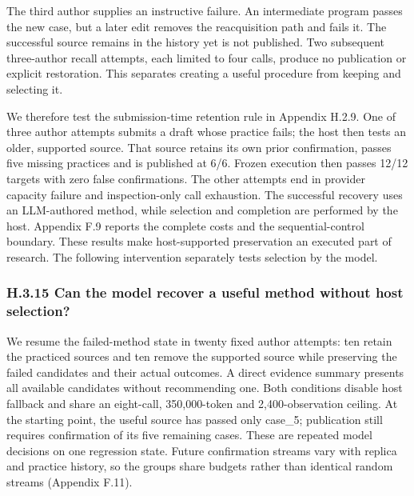 \documentclass[twoside,11pt]{article}
\begin{document}
The third author supplies an instructive failure. An intermediate program passes
the new case, but a later edit removes the reacquisition path and fails it. The
successful source remains in the history yet is not published. Two subsequent
three-author recall attempts, each limited to four calls, produce no publication
or explicit restoration. This separates creating a useful procedure from keeping
and selecting it.


We therefore test the submission-time retention rule in Appendix H.2.9. One of
three author attempts submits a draft whose practice fails; the host then tests
an older, supported source. That source retains its own prior confirmation,
passes five missing practices and is published at 6/6. Frozen execution then
passes 12/12 targets with zero false confirmations. The other attempts end in
provider capacity failure and inspection-only call exhaustion. The successful
recovery uses an LLM-authored method, while selection and completion are performed
by the host. Appendix F.9 reports the complete costs and the sequential-control
boundary. These results make host-supported preservation an executed part of research.
The following intervention separately tests selection by the model.


\subsubsection*{H.3.15 Can the model recover a useful method without host selection?}

We resume the failed-method state in twenty fixed author attempts: ten retain
the practiced sources and ten remove the supported source while preserving the
failed candidates and their actual outcomes. A direct evidence summary presents
all available candidates without recommending one. Both conditions disable host
fallback and share an eight-call, 350,000-token and 2,400-observation ceiling.
At the starting point, the useful source has passed only case\_5; publication
still requires confirmation of its five remaining cases. These are repeated
model decisions on one regression state. Future confirmation streams vary with
replica and practice history, so the groups share budgets rather than identical
random streams (Appendix F.11).
\end{document}
